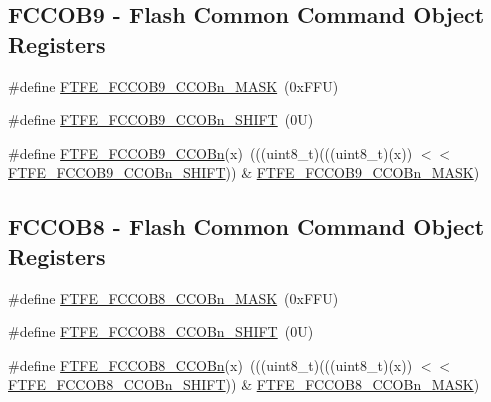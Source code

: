 \subsection*{F\+C\+C\+O\+B9 -\/ Flash Common Command Object Registers}
\begin{DoxyCompactItemize}
\item 
\#define \mbox{\hyperlink{group___f_t_f_e___register___masks_ga6dd6be8d6e5ab42f88bc3864ff18988e}{F\+T\+F\+E\+\_\+\+F\+C\+C\+O\+B9\+\_\+\+C\+C\+O\+Bn\+\_\+\+M\+A\+SK}}~(0x\+F\+F\+U)
\item 
\#define \mbox{\hyperlink{group___f_t_f_e___register___masks_gae878f577523db2f4b3e57defa8d0aa9f}{F\+T\+F\+E\+\_\+\+F\+C\+C\+O\+B9\+\_\+\+C\+C\+O\+Bn\+\_\+\+S\+H\+I\+FT}}~(0\+U)
\item 
\#define \mbox{\hyperlink{group___f_t_f_e___register___masks_gad71cfcc7c31cfe8aee5f11aa4d6b2b74}{F\+T\+F\+E\+\_\+\+F\+C\+C\+O\+B9\+\_\+\+C\+C\+O\+Bn}}(x)~(((uint8\+\_\+t)(((uint8\+\_\+t)(x)) $<$$<$ \mbox{\hyperlink{group___f_t_f_e___register___masks_gae878f577523db2f4b3e57defa8d0aa9f}{F\+T\+F\+E\+\_\+\+F\+C\+C\+O\+B9\+\_\+\+C\+C\+O\+Bn\+\_\+\+S\+H\+I\+FT}})) \& \mbox{\hyperlink{group___f_t_f_e___register___masks_ga6dd6be8d6e5ab42f88bc3864ff18988e}{F\+T\+F\+E\+\_\+\+F\+C\+C\+O\+B9\+\_\+\+C\+C\+O\+Bn\+\_\+\+M\+A\+SK}})
\end{DoxyCompactItemize}
\subsection*{F\+C\+C\+O\+B8 -\/ Flash Common Command Object Registers}
\begin{DoxyCompactItemize}
\item 
\#define \mbox{\hyperlink{group___f_t_f_e___register___masks_gab782fa18693d9a3113b2d58a492717b4}{F\+T\+F\+E\+\_\+\+F\+C\+C\+O\+B8\+\_\+\+C\+C\+O\+Bn\+\_\+\+M\+A\+SK}}~(0x\+F\+F\+U)
\item 
\#define \mbox{\hyperlink{group___f_t_f_e___register___masks_ga4d31b50304dbb610e569fd53dcb8eed5}{F\+T\+F\+E\+\_\+\+F\+C\+C\+O\+B8\+\_\+\+C\+C\+O\+Bn\+\_\+\+S\+H\+I\+FT}}~(0\+U)
\item 
\#define \mbox{\hyperlink{group___f_t_f_e___register___masks_ga9fde6899ba660799f46c3fe4ffd0d5fb}{F\+T\+F\+E\+\_\+\+F\+C\+C\+O\+B8\+\_\+\+C\+C\+O\+Bn}}(x)~(((uint8\+\_\+t)(((uint8\+\_\+t)(x)) $<$$<$ \mbox{\hyperlink{group___f_t_f_e___register___masks_ga4d31b50304dbb610e569fd53dcb8eed5}{F\+T\+F\+E\+\_\+\+F\+C\+C\+O\+B8\+\_\+\+C\+C\+O\+Bn\+\_\+\+S\+H\+I\+FT}})) \& \mbox{\hyperlink{group___f_t_f_e___register___masks_gab782fa18693d9a3113b2d58a492717b4}{F\+T\+F\+E\+\_\+\+F\+C\+C\+O\+B8\+\_\+\+C\+C\+O\+Bn\+\_\+\+M\+A\+SK}})
\end{DoxyCompactItemize}
